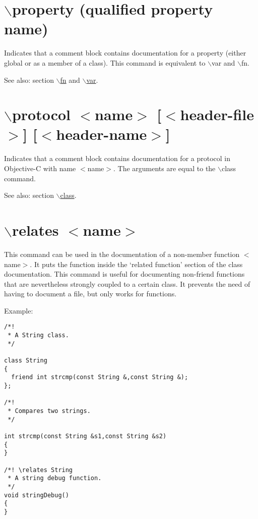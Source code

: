  \hypertarget{commands_cmdproperty}{}\section{$\backslash$property (qualified property name)}\label{commands_cmdproperty}
 Indicates that a comment block contains documentation for a property (either global or as a member of a class). This command is equivalent to $\backslash$var and $\backslash$fn.

\begin{Desc}
\item[See also:]section \hyperlink{commands_cmdfn}{$\backslash$fn} and \hyperlink{commands_cmdvar}{$\backslash$var}.\end{Desc}


 \hypertarget{commands_cmdprotocol}{}\section{$\backslash$protocol $<$name$>$ \mbox{[}$<$header-file$>$\mbox{]} \mbox{[}$<$header-name$>$\mbox{]}}\label{commands_cmdprotocol}
 Indicates that a comment block contains documentation for a protocol in Objective-C with name $<$name$>$. The arguments are equal to the $\backslash$class command.

\begin{Desc}
\item[See also:]section \hyperlink{commands_cmdclass}{$\backslash$class}.\end{Desc}


 \hypertarget{commands_cmdrelates}{}\section{$\backslash$relates $<$name$>$}\label{commands_cmdrelates}
 This command can be used in the documentation of a non-member function $<$name$>$. It puts the function inside the `related function' section of the class documentation. This command is useful for documenting non-friend functions that are nevertheless strongly coupled to a certain class. It prevents the need of having to document a file, but only works for functions.

\begin{Desc}
\item[Example:]

\begin{VerbInclude}\begin{verbatim}/*! 
 * A String class.
 */ 
  
class String
{
  friend int strcmp(const String &,const String &);
};

/*! 
 * Compares two strings.
 */

int strcmp(const String &s1,const String &s2)
{
}

/*! \relates String
 * A string debug function.
 */
void stringDebug()
{
}
\end{verbatim}
\end{VerbInclude}
 \end{Desc}


